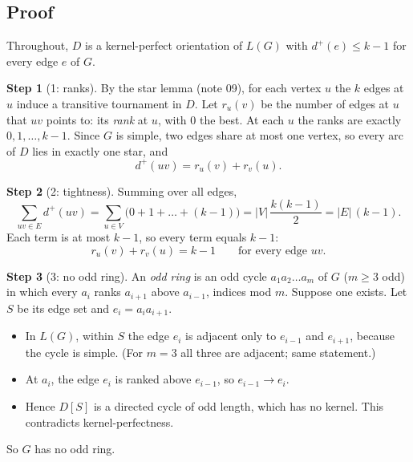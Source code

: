 \documentclass[11pt]{article}
\theoremstyle{plain}
\theoremstyle{definition}
\newtheorem*{step}{Step}
\newcommand{\dout}{d^{+}}
\begin{document}
\subsection*{Proof}

Throughout, $D$ is a kernel-perfect orientation of $L(G)$ with $\dout(e) \le k-1$ for every
edge $e$ of $G$.

\begin{step}[1: ranks]
By the star lemma (note 09), for each vertex $u$ the $k$ edges at $u$ induce a transitive
tournament in $D$. Let $r_u(v)$ be the number of edges at $u$ that $uv$ points to: its
\emph{rank} at $u$, with $0$ the best. At each $u$ the ranks are exactly $0, 1, \dots, k-1$.
Since $G$ is simple, two edges share at most one vertex, so every arc of $D$ lies in exactly
one star, and
\[
  \dout(uv) = r_u(v) + r_v(u).
\]
\end{step}

\begin{step}[2: tightness]
Summing over all edges,
\[
  \sum_{uv \in E} \dout(uv) = \sum_{u \in V} \bigl(0 + 1 + \dots + (k-1)\bigr)
  = |V|\,\frac{k(k-1)}{2} = |E|\,(k-1).
\]
Each term is at most $k-1$, so every term equals $k-1$:
\[
  r_u(v) + r_v(u) = k-1 \qquad \text{for every edge } uv.
\]
\end{step}

\begin{step}[3: no odd ring]
An \emph{odd ring} is an odd cycle $a_1 a_2 \dots a_m$ of $G$ ($m \ge 3$ odd) in which every
$a_i$ ranks $a_{i+1}$ above $a_{i-1}$, indices mod $m$. Suppose one exists. Let $S$ be its edge
set and $e_i = a_i a_{i+1}$.
\begin{itemize}[nosep]
  \item In $L(G)$, within $S$ the edge $e_i$ is adjacent only to $e_{i-1}$ and $e_{i+1}$,
        because the cycle is simple. (For $m = 3$ all three are adjacent; same statement.)
  \item At $a_i$, the edge $e_i$ is ranked above $e_{i-1}$, so $e_{i-1} \to e_i$.
  \item Hence $D[S]$ is a directed cycle of odd length, which has no kernel. This contradicts
        kernel-perfectness.
\end{itemize}
So $G$ has no odd ring.
\end{step}
\end{document}

